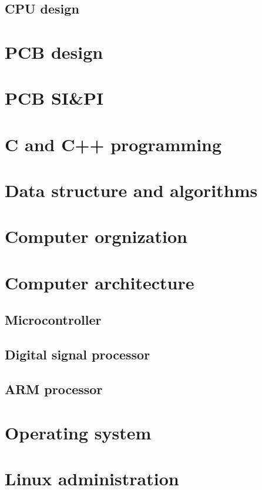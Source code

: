 \documentclass[UTF8]{book}
\begin{document}
	\chapter{CPU design}
	\label{CPU design}
	
	\part{PCB design}
	\label{PCB design}
	
	\part{PCB SI\&PI}
	
	\part{C and C++ programming}
	
	\part{Data structure and algorithms}
	
	\part{Computer orgnization}
	
	\part{Computer architecture}
	\chapter{Microcontroller}
	\chapter{Digital signal processor}
	\chapter{ARM processor}
	
	\part{Operating system}
	
	\part{Linux administration}
	
\end{document}
